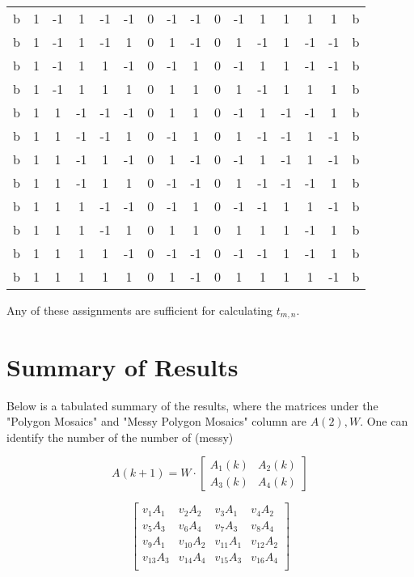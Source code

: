 \documentclass[12pt]{article}
\theoremstyle{plain}
\theoremstyle{definition}
\theoremstyle{remark}
\theoremstyle{definition}
\begin{document}
\begin{center}
\begin{tabular}{|c|c|c|c|c|c|c|c|c|c|c|c|c|c|c|c|}
b & 1 & -1 & 1 & -1 & -1 & 0 & -1 & -1 & 0 & -1 & 1 & 1 & 1 & 1 & b \\
b & 1 & -1 & 1 & -1 & 1 & 0 & 1 & -1 & 0 & 1 & -1 & 1 & -1 & -1 & b \\
b & 1 & -1 & 1 & 1 & -1 & 0 & -1 & 1 & 0 & -1 & 1 & 1 & -1 & -1 & b \\
b & 1 & -1 & 1 & 1 & 1 & 0 & 1 & 1 & 0 & 1 & -1 & 1 & 1 & 1 & b \\
b & 1 & 1 & -1 & -1 & -1 & 0 & 1 & 1 & 0 & -1 & 1 & -1 & -1 & 1 & b \\
b & 1 & 1 & -1 & -1 & 1 & 0 & -1 & 1 & 0 & 1 & -1 & -1 & 1 & -1 & b \\
b & 1 & 1 & -1 & 1 & -1 & 0 & 1 & -1 & 0 & -1 & 1 & -1 & 1 & -1 & b \\
b & 1 & 1 & -1 & 1 & 1 & 0 & -1 & -1 & 0 & 1 & -1 & -1 & -1 & 1 & b \\
b & 1 & 1 & 1 & -1 & -1 & 0 & -1 & 1 & 0 & -1 & -1 & 1 & 1 & -1 & b \\
b & 1 & 1 & 1 & -1 & 1 & 0 & 1 & 1 & 0 & 1 & 1 & 1 & -1 & 1 & b \\
b & 1 & 1 & 1 & 1 & -1 & 0 & -1 & -1 & 0 & -1 & -1 & 1 & -1 & 1 & b \\
b & 1 & 1 & 1 & 1 & 1 & 0 & 1 & -1 & 0 & 1 & 1 & 1 & 1 & -1 & b \\
\hline
\end{tabular}
\end{center}

Any of these assignments are sufficient for calculating $t_{m,n}$. 

\section{Summary of Results}
\label{section: summary of results}

Below is a tabulated summary of the results, where the matrices under the "Polygon Mosaics" and "Messy Polygon Mosaics" column are $A(2), W$. One can identify the number of  the number of (messy)

$$A(k+1) = W \cdot \begin{bmatrix}
    A_1(k) & A_2(k) \\
    A_3(k) & A_4(k)
    \end{bmatrix}$$

$$\begin{bmatrix}
    v_{1}A_1 & v_{2}A_2 & v_{3}A_1 & v_{4}A_2 \\
    v_{5}A_3 & v_{6}A_4 & v_{7}A_3 & v_{8}A_4 \\
    v_{9}A_1 & v_{10}A_2 & v_{11}A_1 & v_{12}A_2 \\
    v_{13}A_3 & v_{14}A_4 & v_{15}A_3 & v_{16}A_4 \\
\end{bmatrix}$$
\end{document}
